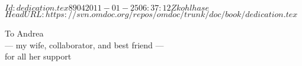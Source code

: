 \svnInfo $Id: dedication.tex 8904 2011-01-25 06:37:12Z kohlhase $
\svnKeyword $HeadURL: https://svn.omdoc.org/repos/omdoc/trunk/doc/book/dedication.tex $

\thispagestyle{empty}
\vspace*{3.5cm}
\begin{omtext}
\begin{center}\LARGE
  To Andrea\\
  --- my wife, collaborator, and best friend ---\\
  for all her support
\end{center}
\end{omtext}

